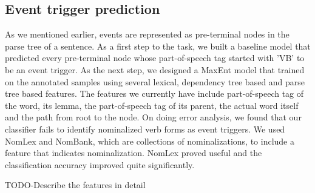 \subsection{Event trigger prediction}
As we mentioned earlier, events are represented as pre-terminal nodes in the parse tree of a sentence. As a first step to the task, we built a baseline model that predicted every pre-terminal node whose part-of-speech tag started with 'VB' to be an event trigger. As the next step, we designed a MaxEnt model that trained on the annotated samples using several lexical, dependency tree based and parse tree based features. The features we currently have include part-of-speech tag of the word, its lemma, the part-of-speech tag of its parent, the actual word itself and the path from root to the node. On doing error analysis, we found that our classifier fails to identify nominalized verb forms as event triggers. We used NomLex and NomBank, which are collections of nominalizations, to include a feature that indicates nominalization. NomLex proved useful and the classification accuracy improved quite significantly.

TODO-Describe the features in detail